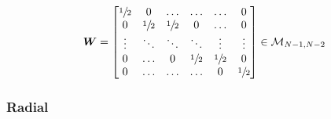 \documentclass[aps,onecolumn,11pt]{revtex4}
\newcommand{\half}{{\sfrac{1}{2}}}
\newcommand{\mat}[1]{{\bm{#1}}}
\begin{document}
\begin{equation}
	\mat{W} = 
	\begin{bmatrix}
	\half & 0     & \ldots &\ldots & \ldots & 0 \\
	 0    & \half & \half & 0     & \ldots & 0 \\
	 \vdots & \ddots & \ddots & \ddots & \vdots & \vdots \\
	 0      & \ldots & 0& \half& \half  &  0     \\ 
	 0      & \ldots & \ldots & \ldots &  0 & \half \\                
	\end{bmatrix} \in \mathcal{M}_{N-1,N-2}
\end{equation}


\subsubsection{Radial}
\end{document}
